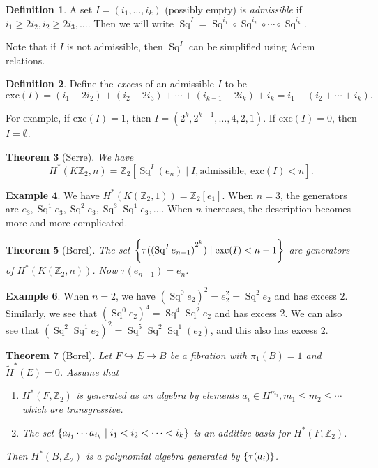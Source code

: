 \documentclass[leqno, openany]{memoir}
\newtheorem{thm}{Theorem}[section]
\theoremstyle{definition}
\newtheorem{defn}[thm]{Definition}
\newtheorem{exm}[thm]{Example}
\theoremstyle{remark}
\theoremstyle{plain}
\theoremstyle{definition}
\theoremstyle{remark}
\newcommand{\Z}{\mathbb{Z}}
\newcommand{\mr}[1]{\mathrm{#1}}
\newcommand{\wt}[1]{\widetilde{#1}}
\DeclareMathOperator{\Sq}{Sq}
\begin{document}
\begin{defn}
    A set $I = (i_1, \ldots, i_k)$ (possibly empty) is \textit{admissible} if $i_1 \geq 2 i_2, i_2 \geq 2 i_3, \ldots$. Then we will write $\Sq^I = \Sq^{i_1} \circ \Sq^{i_2} \circ \cdots \circ \Sq^{i_k}$.
\end{defn}

Note that if $I$ is not admissible, then $\Sq^I$ can be simplified using Adem relations.

\begin{defn}
    Define the \textit{excess} of an admissible $I$ to be 
    \[ \mr{exc}(I) = (i_1 - 2 i_2) + (i_2 - 2 i_3) + \cdots + (i_{k-1} - 2 i_k) + i_k = i_1 - (i_2 + \cdots + i_k). \]
\end{defn}

For example, if $\mr{exc}(I) = 1$, then $I = (2^k, 2^{k-1}, \ldots, 4, 2, 1)$. If $\mr{exc}(I) = 0$, then $I = \emptyset$.

\begin{thm}[Serre]
    We have
    \[ H^*(K\Z_2, n) = \Z_2 [\Sq^I (e_n) \mid I, \text{admissible},\ \mr{exc}(I) < n]. \]
\end{thm}

\begin{exm}
    We have $H^*(K(\Z_2, 1)) = \Z_2[e_1]$. When $n=3$, the generators are $e_3, \Sq^1 e_3, \Sq^2 e_3, \Sq^3 \Sq^1 e_3, \ldots$. When $n$ increases, the description becomes more and more complicated.
\end{exm}

\begin{thm}[Borel]
    The set $\qty{\tau({(\Sq^I e_{n-1})}^{2^k}) \mid \mr{exc}(I) < n-1}$ are generators of $H^*(K(\Z_2, n))$. Now $\tau(e_{n-1}) = e_n$.
\end{thm}

\begin{exm}
    When $n = 2$, we have ${( \Sq^0 e_2 )}^2 = e_2^2 = \Sq^2 e_2$ and has excess $2$. Similarly, we see that ${(\Sq^0 e_2)}^4 = \Sq^4 \Sq^2 e_2$ and has excess $2$. We can also see that ${(\Sq^2 \Sq^1 e_2)}^2 = \Sq^5 \Sq^2 \Sq^1 (e_2)$, and this also has excess $2$.
\end{exm}

\begin{thm}[Borel]
    Let $F \hookrightarrow E \to B$ be a fibration with $\pi_1(B) = 1$ and $\wt{H}^*(E) = 0$. Assume that
    \begin{enumerate}
        \item $H^*(F, \Z_2)$ is generated as an algebra by elements $a_i \in H^{m_i}, m_1 \leq m_2 \leq \cdots$ which are transgressive.
        \item The set $\qty{a_{i_1} \cdots a_{i_k} \mid i_1 < i_2 < \cdots < i_k}$ is an additive basis for $H^*(F, \Z_2)$.
    \end{enumerate}
    Then $H^*(B, \Z_2)$ is a polynomial algebra generated by $\qty{\tau (a_i)}$.
\end{thm}
\end{document}
